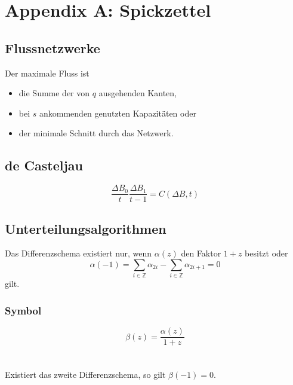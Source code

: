 \section{Appendix A: Spickzettel}

\subsection{Flussnetzwerke}
Der maximale Fluss ist
\begin{itemize}
	\item die Summe der von \(q\) ausgehenden Kanten,
	\item bei \(s\) ankommenden genutzten Kapazitäten oder
	\item der minimale Schnitt durch das Netzwerk.
\end{itemize}


\subsection{de Casteljau}
\[\frac{\Delta B_0}{t} \frac{\Delta B_1}{t-1} = C(\Delta B,t)\]


\subsection{Unterteilungsalgorithmen}
Das Differenzschema existiert nur, wenn \(\alpha(z)\) den Faktor \(1+z\) besitzt oder
\[\alpha(-1) = \sum_{i \in \mathbb{Z}} \alpha_{2i} - \sum_{i \in \mathbb{Z}}\alpha_{2i + 1} = 0\]
gilt.
	
\subsubsection{Symbol}
\[\beta(z) = \frac{\alpha(z)}{1+z}\]
\\\\
Existiert das zweite Differenzschema, so gilt \(\beta(-1)=0\).
